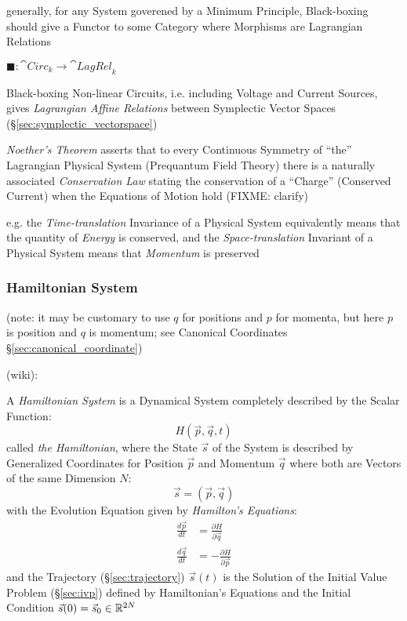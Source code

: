 generally, for any System goverened by a Minimum Principle, Black-boxing should
give a Functor to some Category where Morphisms are Lagrangian Relations

$\blacksquare : \cat{Circ}_k \rightarrow \cat{LagRel}_k$

Black-boxing Non-linear Circuits, i.e. including Voltage and Current Sources,
gives \emph{Lagrangian Affine Relations} between Symplectic Vector Spaces
(\S\ref{sec:symplectic_vectorspace})

\asterism

\emph{Noether's Theorem} asserts that to every Continuous Symmetry of ``the''
Lagrangian Physical System (Prequantum Field Theory) there is a naturally
associated \emph{Conservation Law} stating the conservation of a ``Charge''
(Conserved Current) when the Equations of Motion hold (FIXME: clarify)

e.g. the \emph{Time-translation} Invariance of a Physical System equivalently
means that the quantity of \emph{Energy} is conserved, and the
\emph{Space-translation} Invariant of a Physical System means that
\emph{Momentum} is preserved



\subsubsection{Hamiltonian System}\label{sec:hamiltonian_system}

(note: it may be customary to use $q$ for positions and $p$ for momenta, but
here $p$ is position and $q$ is momentum; see Canonical Coordinates
\S\ref{sec:canonical_coordinate})

(wiki):

A \emph{Hamiltonian System} is a Dynamical System completely described by the
Scalar Function:
\[
  H(\vec{p},\vec{q},t)
\]
called \emph{the Hamiltonian}, where the State $\vec{s}$ of the System is
described by Generalized Coordinates for Position $\vec{p}$ and Momentum
$\vec{q}$ where both are Vectors of the same Dimension $N$:
\[
  \vec{s} = (\vec{p},\vec{q})
\]
with the Evolution Equation given by \emph{Hamilton's Equations}:
\begin{align*}
  \frac{d\vec{p}}{dt} & = \frac{\partial{H}}{\partial{\vec{q}}} \\
  \frac{d\vec{q}}{dt} & = -\frac{\partial{H}}{\partial{\vec{p}}}
\end{align*}
and the Trajectory (\S\ref{sec:trajectory}) $\vec{s}(t)$ is the Solution of
the Initial Value Problem (\S\ref{sec:ivp}) defined by Hamiltonian's Equations
and the Initial Condition $\vec{s}(0) = \vec{s}_0 \in \mathbb{R}^{2N}$

